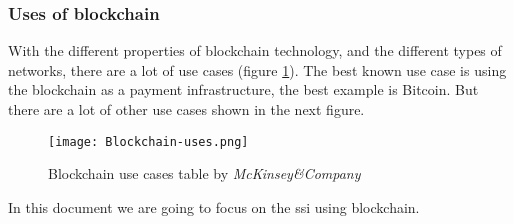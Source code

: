 \subsubsection{Uses of blockchain}
With the different properties of blockchain technology, and the different types of networks, there are a lot of use cases (figure \ref{fig:blockchain_uses}). The best known use case is using the blockchain as a payment infrastructure, the best example is Bitcoin. But there are a lot of other use cases shown in the next figure.\\
\begin{figure}[h]
    \centering
    \texttt{[image: Blockchain-uses.png]}
    \caption{Blockchain use cases table by \textit{McKinsey\&Company}}
    \label{fig:blockchain_uses}
\end{figure}

In this document we are going to focus on the \acrfull{ssi} using blockchain.
